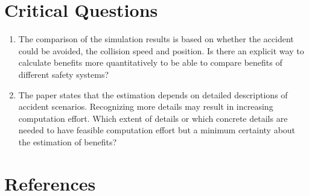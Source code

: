 \documentclass[oneside, notitlepage, twocolumn]{scrartcl}
\begin{document}
\section{Critical Questions}
\begin{enumerate}
    \item The comparison of the simulation results is based on whether the accident could be avoided, the collision speed and position.
        Is there an explicit way to calculate benefits more quantitatively to be able to compare benefits of different safety systems?
    \item The paper states that the estimation depends on detailed descriptions of accident scenarios.
        Recognizing more details may result in increasing computation effort.
        Which extent of details or which concrete details are needed to have feasible computation effort but a minimum certainty about the estimation of benefits?
\end{enumerate}

\section{References}
\begingroup
\renewcommand{\section}[2]{}%
\nocite{*}
\printbibliography%
\endgroup
\end{document}
